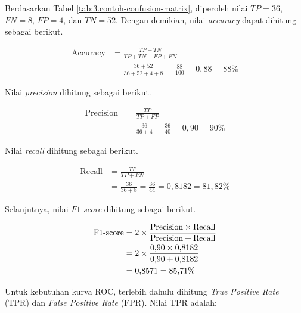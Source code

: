 Berdasarkan Tabel \ref{tab:3.contoh-confusion-matrix}, diperoleh nilai $TP = 36$, $FN = 8$, $FP = 4$, dan $TN = 52$. Dengan demikian, nilai \textit{accuracy} dapat dihitung sebagai berikut. \par

\begingroup
\setlength{\abovedisplayskip}{8pt}
\setlength{\belowdisplayskip}{10pt}
\setlength{\abovedisplayshortskip}{8pt}
\setlength{\belowdisplayshortskip}{10pt}
\setlength{\jot}{6pt}

\begin{align*}
\text{Accuracy} &= \frac{TP + TN}{TP + TN + FP + FN} \\
&= \frac{36 + 52}{36 + 52 + 4 + 8} = \frac{88}{100} = 0{,}88 = 88\%
\end{align*}
\par

Nilai \textit{precision} dihitung sebagai berikut. \par

\begin{align*}
\text{Precision} &= \frac{TP}{TP + FP} \\
&= \frac{36}{36 + 4} = \frac{36}{40} = 0{,}90 = 90\%
\end{align*}
\par

Nilai \textit{recall} dihitung sebagai berikut. \par

\begin{align*}
\text{Recall} &= \frac{TP}{TP + FN} \\
&= \frac{36}{36 + 8} = \frac{36}{44} = 0{,}8182 = 81{,}82\%
\end{align*}
\par

Selanjutnya, nilai $F1$-\textit{score} dihitung sebagai berikut. \par

\begin{align*}
\text{F1\mbox{-}score} &= 2 \times \frac{\text{Precision} \times \text{Recall}}{\text{Precision} + \text{Recall}} \\
&= 2 \times \frac{0{,}90 \times 0{,}8182}{0{,}90 + 0{,}8182} \\
&= 0{,}8571 = 85{,}71\%
\end{align*}
\par

Untuk kebutuhan kurva ROC, terlebih dahulu dihitung \textit{True Positive Rate} (TPR) dan \textit{False Positive Rate} (FPR). Nilai TPR adalah: \par

